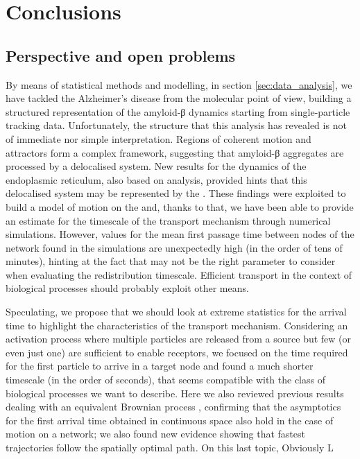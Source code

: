 
\chapter{Conclusions}

\section{Perspective and open problems}

By means of statistical methods and modelling, in section \ref{sec:data_analysis}, we have tackled the Alzheimer's disease from the molecular point of view, building a structured representation of the amyloid-β dynamics starting from single-particle tracking data.
Unfortunately, the structure that this analysis has revealed is not of immediate nor simple interpretation.
Regions of coherent motion and attractors form a complex framework, suggesting that amyloid-β aggregates are processed by a delocalised system.
New results for the dynamics of the endoplasmic reticulum, also based on  analysis, provided hints that this delocalised system may be represented by the .
These findings were exploited to build a model of motion on the  and, thanks to that, we have been able to provide an estimate for the timescale of the  transport mechanism through numerical simulations.
However, values for the mean first passage time between nodes of the network found in the simulations are unexpectedly high (in the order of tens of minutes), hinting at the fact that  may not be the right parameter to consider when evaluating the redistribution timescale. Efficient transport in the context of biological processes should probably exploit other means.

Speculating, we propose that we should look at extreme statistics for the arrival time to highlight the characteristics of the transport mechanism.
Considering an activation process where multiple particles are released from a source but few (or even just one) are sufficient to enable receptors, we focused on the time required for the first particle to arrive in a target node and found a much shorter timescale (in the order of seconds), that seems compatible with the class of biological processes we want to describe.
Here we also reviewed previous results dealing with an equivalent Brownian process , confirming that the asymptotics for the first arrival time obtained in continuous space also hold in the case of motion on a network; we also found new evidence showing that fastest trajectories follow the spatially optimal path.
On this last topic, %
Obviously
L

